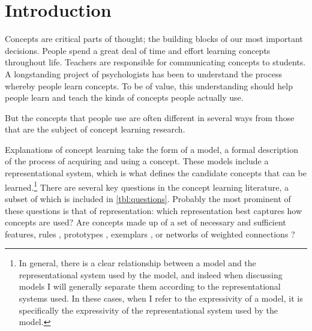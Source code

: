 \documentclass[doc,floatsintext]{apa6}
\begin{document}
\section{Introduction}


Concepts are critical parts of thought; the building blocks of our most important decisions.
People spend a great deal of time and effort learning concepts throughout life.
Teachers are responsible for communicating concepts to students.
A longstanding project of psychologists has been to understand the process whereby people learn concepts.
To be of value, this understanding should help people learn and teach the kinds of concepts people actually use.

But the concepts that people use are often different in several ways from those that are the subject of concept learning research.

Explanations of concept learning take the form of a model, a formal description of the process of acquiring and using a concept.
These models include a representational system, which is what defines the candidate concepts that can be learned.\footnote{In general, there is a clear relationship between a model and the representational system used by the model, and indeed when discussing models I will generally separate them according to the representational systems used. In these cases, when I refer to the expressivity of a model, it is specifically the expressivity of the representational system used by the model.}
There are several key questions in the concept learning literature, a subset of which is included in \cref{tbl:questions}.
Probably the most prominent of these questions is that of representation: which representation best captures how concepts are used? Are concepts made up of a set of necessary and sufficient features, rules \citep[e.g.][]{goodmantfg2008}, prototypes \citep[e.g.][]{rosch1973}, exemplars \citep[e.g.][]{medins1988}, or networks of weighted connections \citep[e.g.][]{lovemg2004}?
\end{document}
